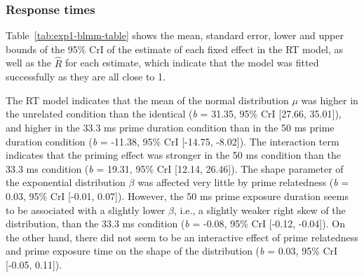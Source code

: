 \documentclass[
  english,
  man,floatsintext]{apa6}
\begin{document}
\newpage

\hypertarget{response-times}{%
\subsubsection{Response times}\label{response-times}}

Table~\ref{tab:exp1-blmm-table} shows the mean, standard error, lower and upper bounds of the 95\% CrI of the estimate of each fixed effect in the RT model, as well as the \(\hat{R}\) for each estimate, which indicate that the model was fitted successfully as they are all close to 1.

The RT model indicates that the mean of the normal distribution \(\mu\) was higher in the unrelated condition than the identical (\emph{b} = 31.35, 95\% CrI {[}27.66, 35.01{]}), and higher in the 33.3 ms prime duration condition than in the 50 ms prime duration condition (\emph{b} = -11.38, 95\% CrI {[}-14.75, -8.02{]}). The interaction term indicates that the priming effect was stronger in the 50 ms condition than the 33.3 ms condition (\emph{b} = 19.31, 95\% CrI {[}12.14, 26.46{]}). The shape parameter of the exponential distribution \(\beta\) was affected very little by prime relatedness (\emph{b} = 0.03, 95\% CrI {[}-0.01, 0.07{]}). However, the 50 ms prime exposure duration seems to be associated with a slightly lower \(\beta\), i.e., a slightly weaker right skew of the distribution, than the 33.3 ms condition (\emph{b} = -0.08, 95\% CrI {[}-0.12, -0.04{]}). On the other hand, there did not seem to be an interactive effect of prime relatedness and prime exposure time on the shape of the distribution (\emph{b} = 0.03, 95\% CrI {[}-0.05, 0.11{]}).
\end{document}
